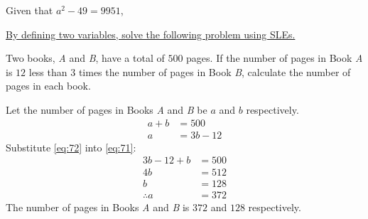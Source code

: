 \documentclass[11pt, answers, addpoints]{exam}
\begin{document}
\begin{questions}
	\question Given that \(a^{2} - 49 = 9951\),


	\question[4] \underline{By defining two variables, solve the following problem using SLEs.}

	Two books, \textit{A} and \textit{B}, have a total of \(500\) pages. If the number of pages in Book \textit{A} is \(12\) less than \(3\) times the number of pages in Book \textit{B}, calculate the number of pages in each book.

	\begin{solution}
		Let the number of pages in Books \textit{A} and \textit{B} be \(a\) and \(b\) respectively.
		\begin{align}
			a + b & = 500\label{eq:71}     \\
			a     & = 3b - 12\label{eq:72}
		\end{align}
		Substitute \eqref{eq:72} into \eqref{eq:71}:
		\begin{align*}
			3b - 12 + b  & = 500 \\
			4b           & = 512 \\
			b            & = 128 \\
			\therefore a & = 372
		\end{align*}
		The number of pages in Books \textit{A} and \textit{B} is \(372\) and \(128\) respectively.
	\end{solution}



\end{questions}
\end{document}
